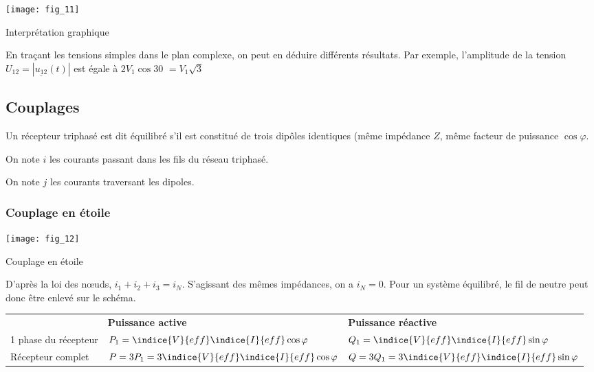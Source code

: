 \begin{marginfigure}
\centering
\texttt{[image: fig\_11]}
\caption{Interprétation graphique \label{fig:ge:cours:11}}
\end{marginfigure}

En traçant les tensions simples dans le plan complexe, on peut en déduire différents résultats. 
Par exemple, l'amplitude de la tension $U_{12}=|\underline{u_{12}}(t)|$ est égale à $2V_1\cos 30$ 
$ = {V}_{1}\sqrt{3}$ 



\subsection{Couplages}
\begin{defi}
Un récepteur triphasé est dit équilibré s'il est constitué de trois dipôles identiques (même impédance $Z$, même facteur de puissance $\cos\varphi$.

On note $i$ les courants passant dans les fils du réseau triphasé.

On note $j$ les courants traversant les dipoles.
\end{defi}

\subsubsection{Couplage en étoile}


\begin{marginfigure}
\centering
\texttt{[image: fig\_12]}
\caption{Couplage en étoile \label{fig:ge:cours:12}}
\end{marginfigure}

D'après la loi des n\oe{}uds, $i_1 + i_2 + i_3 = i_N$. S'agissant des mêmes impédances, on a $i_N=0$. Pour un système équilibré, le fil de neutre peut donc être enlevé sur le schéma.

\begin{tabular}{lll}
\hline
& \textbf{Puissance active} & \textbf{Puissance réactive} \\ 
1 phase du récepteur & 
$P_1 = \indice{V}{eff}\indice{I}{eff} \cos \varphi$ &
$Q_1 = \indice{V}{eff}\indice{I}{eff} \sin \varphi$ \\
Récepteur complet & 
$P = 3P_1 =  3\indice{V}{eff}\indice{I}{eff} \cos \varphi$ &
$Q = 3Q_1 = 3 \indice{V}{eff}\indice{I}{eff} \sin \varphi$ \\
\hline
\end{tabular}

